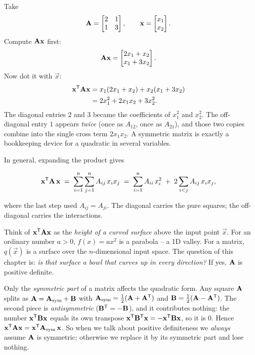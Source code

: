 \begin{example}
\label{ch27:ex-unpack}
Take
\[
  \mathbf{A} = \begin{bmatrix} 2 & 1 \\ 1 & 3 \end{bmatrix}, \qquad
  \mathbf{x} = \begin{bmatrix}x_1 \\ x_2\end{bmatrix}.
\]
Compute $\mathbf{A}\mathbf{x}$ first:
\[
  \mathbf{A}\mathbf{x} = \begin{bmatrix}2x_1 + x_2 \\ x_1 + 3x_2\end{bmatrix}.
\]
Now dot it with $\vec{x}$:
\begin{align*}
  \mathbf{x}^{\mathsf{T}} \mathbf{A}\mathbf{x}
  &= x_1(2x_1 + x_2) + x_2(x_1 + 3x_2) \\
  &= 2x_1^2 + 2x_1 x_2 + 3x_2^2.
\end{align*}
The diagonal entries $2$ and $3$ became the coefficients of $x_1^2$ and
$x_2^2$. The off-diagonal entry $1$ appears \emph{twice} (once as $A_{12}$, once as $A_{21}$), and
those two copies combine into the single cross term $2 x_1 x_2$. A symmetric matrix is exactly a
bookkeeping device for a quadratic in several variables.
\end{example}

In general, expanding the product gives

\[
  \mathbf{x}^{\mathsf{T}} \mathbf{A}\, \mathbf{x} \;=\; \sum_{i=1}^n \sum_{j=1}^n A_{ij}\, x_i x_j
  \;=\; \sum_{i=1}^n A_{ii}\, x_i^2 \;+\; 2\sum_{i<j} A_{ij}\, x_i x_j,
\]

where the last step used $A_{ij} = A_{ji}$. The diagonal carries the pure squares; the
off-diagonal carries the interactions.

\begin{intuitionbox}
Think of $\mathbf{x}^{\mathsf{T}}\mathbf{A}\mathbf{x}$ as the \emph{height of a curved surface} above the input point $\vec{x}$.
For an ordinary number $a>0$, $f(x) = ax^2$ is a parabola -- a 1D valley. For a matrix, $q(\vec{x})$
is a surface over the $n$-dimensional input space. The question of this chapter is: \emph{is that
surface a bowl that curves up in every direction?} If yes, $\mathbf{A}$ is positive definite.
\end{intuitionbox}

\begin{trapbox}
Only the \emph{symmetric part} of a matrix affects the quadratic form. Any square $\mathbf{A}$ splits
as $\mathbf{A} = \mathbf{A}_{\text{sym}} + \mathbf{B}$ with $\mathbf{A}_{\text{sym}} = \tfrac12(\mathbf{A} +
\mathbf{A}^{\mathsf{T}})$ and $\mathbf{B} = \tfrac12(\mathbf{A} - \mathbf{A}^{\mathsf{T}})$. The second piece is
\emph{antisymmetric} ($\mathbf{B}^{\mathsf{T}} = -\mathbf{B}$), and it contributes nothing: the number
$\mathbf{x}^{\mathsf{T}}\mathbf{B}\mathbf{x}$ equals its own transpose $\mathbf{x}^{\mathsf{T}}\mathbf{B}^{\mathsf{T}}\mathbf{x} =
-\mathbf{x}^{\mathsf{T}}\mathbf{B}\mathbf{x}$, so it is $0$. Hence $\mathbf{x}^{\mathsf{T}}\mathbf{A}\mathbf{x} = \mathbf{x}^{\mathsf{T}}
\mathbf{A}_{\text{sym}}\,\mathbf{x}$. So when we talk about positive definiteness we \emph{always} assume
$\mathbf{A}$ is symmetric; otherwise we replace it by its symmetric part and lose nothing.
\end{trapbox}

